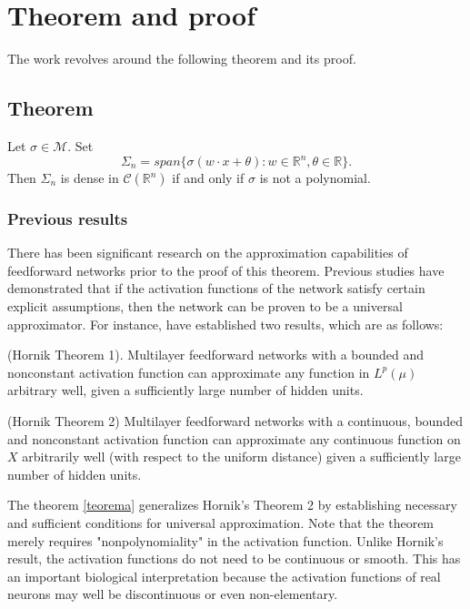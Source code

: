 \documentclass[../main.tex]{subfiles}
\begin{document}
	

	\chapter{Theorem and proof} \label{ch:proof}
\noindent  The work revolves around the following theorem and its proof. 
	\section{Theorem}
	\begin{theorem} Let $ \sigma \in  \mathcal{M}$. Set
		$$ \Sigma_n = span\{\sigma(w\cdot x + \theta) : w\in \mathbb{R}^n, \theta \in \mathbb{R} \}.$$
		Then $\Sigma_n$ is dense in $\mathcal{C}(\mathbb{R}^n)$ if and only if $\sigma$ is not a polynomial. 
	\label{teorema}
	\end{theorem}


\subsection{Previous results}
\noindent  There has been significant research on the approximation capabilities of feedforward networks prior to the proof of this theorem. Previous studies have demonstrated that if the activation functions of the network satisfy certain explicit assumptions, then the network can be proven to be a universal approximator. For instance, \cite{HORNIK1991251} have established two results, which are as follows:

\begin{theorem} (Hornik Theorem 1). Multilayer feedforward networks with a bounded and nonconstant activation function can approximate any function in $L^p(\mu)$ arbitrary well, given a sufficiently large number of hidden units. 
\end{theorem}

\begin{theorem} (Hornik Theorem 2) Multilayer feedforward networks with a continuous, bounded and nonconstant activation function can approximate any continuous function on $X$ arbitrarily well (with respect to the uniform distance) given a sufficiently large number of hidden units. 
\end{theorem}

\noindent
The theorem \ref{teorema} generalizes Hornik's Theorem 2 by establishing necessary and sufficient conditions for universal approximation. Note that the theorem merely requires "nonpolynomiality" in the activation function. Unlike Hornik's result, the activation functions do not need to be continuous or smooth. This has an important biological interpretation because the activation functions of real neurons may well be discontinuous or even non-elementary.
\end{document}
